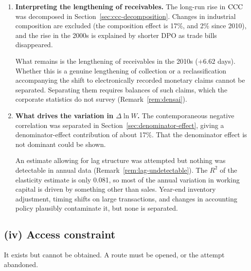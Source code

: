 \begin{enumerate}[label=(\arabic*),start=4]
\item \textbf{Interpreting the lengthening of receivables.}
The long-run rise in $\mathrm{CCC}$ was decomposed in Section~\ref{sec:ccc-decomposition}. Changes in
industrial composition are excluded (the composition effect is 17\%, and 2\% since 2010), and
the rise in the 2000s is explained by shorter DPO as trade bills disappeared.

What remains is the lengthening of receivables in the 2010s ($+6.62$ days). Whether this is a
genuine lengthening of collection or a reclassification accompanying the shift to
electronically recorded monetary claims cannot be separated. Separating them requires
balances of such claims, which the corporate statistics do not survey
(Remark~\ref{rem:densai}).

\item \textbf{What drives the variation in $\Delta\ln W$.}
The contemporaneous negative correlation was separated in
Section~\ref{sec:denominator-effect}, giving a denominator-effect contribution of about 17\%.
That the denominator effect is not dominant could be shown.

An estimate allowing for lag structure was attempted but nothing was detectable in annual
data (Remark~\ref{rem:lag-undetectable}). The $R^2$ of the elasticity estimate is only 0.081,
so most of the annual variation in working capital is driven by something other than sales.
Year-end inventory adjustment, timing shifts on large transactions, and changes in accounting
policy plausibly contaminate it, but none is separated.
\end{enumerate}

\subsection{(iv) Access constraint}

It exists but cannot be obtained. A route must be opened, or the attempt abandoned.

